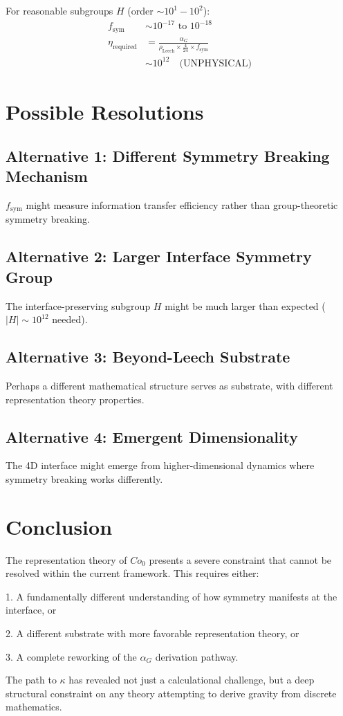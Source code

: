 \documentclass[11pt]{article}
\begin{document}
For reasonable subgroups $H$ (order $\sim 10^1-10^2$):
\begin{align*}
f_{\text{sym}} &\sim 10^{-17} \text{ to } 10^{-18} \\
\eta_{\text{required}} &= \frac{\alpha_G}{\rho_{\text{Leech}} \times \frac{4}{24} \times f_{\text{sym}}} \\
&\sim 10^{12} \quad\text{(UNPHYSICAL)}
\end{align*}

\section{Possible Resolutions}

\subsection{Alternative 1: Different Symmetry Breaking Mechanism}
$f_{\text{sym}}$ might measure information transfer efficiency rather than
group-theoretic symmetry breaking.

\subsection{Alternative 2: Larger Interface Symmetry Group}
The interface-preserving subgroup $H$ might be much larger than expected
($|H| \sim 10^{12}$ needed).

\subsection{Alternative 3: Beyond-Leech Substrate}
Perhaps a different mathematical structure serves as substrate, with
different representation theory properties.

\subsection{Alternative 4: Emergent Dimensionality}
The 4D interface might emerge from higher-dimensional dynamics where
symmetry breaking works differently.

\section{Conclusion}

The representation theory of $Co_0$ presents a severe constraint that
cannot be resolved within the current framework. This requires either:

1. A fundamentally different understanding of how symmetry manifests
   at the interface, or

2. A different substrate with more favorable representation theory, or

3. A complete reworking of the $\alpha_G$ derivation pathway.

The path to $\kappa$ has revealed not just a calculational challenge,
but a deep structural constraint on any theory attempting to derive
gravity from discrete mathematics.
\end{document}
